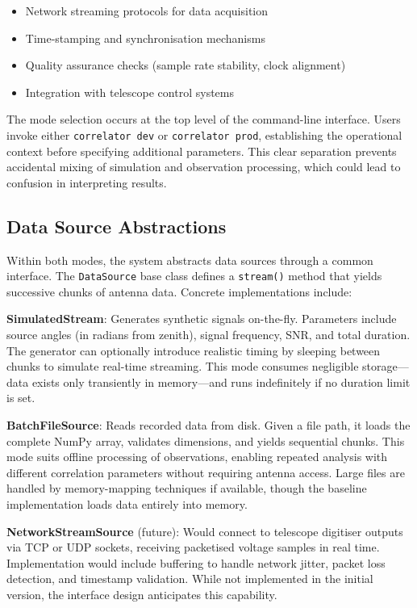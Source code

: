 \begin{itemize}
    \item Network streaming protocols for data acquisition
    \item Time-stamping and synchronisation mechanisms
    \item Quality assurance checks (sample rate stability, clock alignment)
    \item Integration with telescope control systems
\end{itemize}

The mode selection occurs at the top level of the command-line interface. Users invoke either \texttt{correlator dev} or \texttt{correlator prod}, establishing the operational context before specifying additional parameters. This clear separation prevents accidental mixing of simulation and observation processing, which could lead to confusion in interpreting results.

\subsection{Data Source Abstractions}

Within both modes, the system abstracts data sources through a common interface. The \texttt{DataSource} base class defines a \texttt{stream()} method that yields successive chunks of antenna data. Concrete implementations include:

\textbf{SimulatedStream}: Generates synthetic signals on-the-fly. Parameters include source angles (in radians from zenith), signal frequency, SNR, and total duration. The generator can optionally introduce realistic timing by sleeping between chunks to simulate real-time streaming. This mode consumes negligible storage—data exists only transiently in memory—and runs indefinitely if no duration limit is set.

\textbf{BatchFileSource}: Reads recorded data from disk. Given a file path, it loads the complete NumPy array, validates dimensions, and yields sequential chunks. This mode suits offline processing of observations, enabling repeated analysis with different correlation parameters without requiring antenna access. Large files are handled by memory-mapping techniques if available, though the baseline implementation loads data entirely into memory.

\textbf{NetworkStreamSource} (future): Would connect to telescope digitiser outputs via TCP or UDP sockets, receiving packetised voltage samples in real time. Implementation would include buffering to handle network jitter, packet loss detection, and timestamp validation. While not implemented in the initial version, the interface design anticipates this capability.

